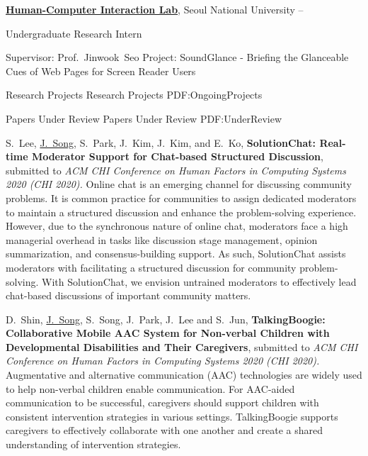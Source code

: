 \documentclass[letterpaper,MMMyyyy,nonstopmode]{template}
\begin{document}
\begin{Body}
\BigGap
\Entry
\href{http://hcil.snu.ac.kr/}
{\textbf{Human-Computer Interaction Lab}},
Seoul National University
\hfill
{} --

\Gap
\BulletItem
Undergraduate Research Intern
\begin{Detail}

\SubBulletItem
Supervisor:
Prof.~Jinwook~Seo
\SubBulletItem
Project:
SoundGlance - Briefing the Glanceable Cues of Web Pages for Screen Reader Users

\end{Detail}



\BigGap
\Section
{Research Projects}
{Research Projects}
{PDF:OngoingProjects}

\SubSection
{Papers Under Review}
{Papers Under Review}
{PDF:UnderReview}

\begingroup
\renewcommand{\MaxNumberedItem}{[88]}

\BigGap
\NumberedItem{[1]}
  S.~Lee, \underline{J.~Song}, S.~Park, J.~Kim, J.~Kim, and E.~Ko,
  \textbf{SolutionChat: Real-time Moderator Support for Chat-based Structured Discussion},
  submitted to \textit{ACM CHI Conference on Human Factors in Computing Systems 2020 (CHI 2020).}
  \vspace{2mm}\newline
  {\small{
    Online chat is an emerging channel for discussing community problems. It is common practice for communities to assign dedicated moderators to maintain a structured discussion and enhance the problem-solving experience. However, due to the synchronous nature of online chat, moderators face a high managerial overhead in tasks like discussion stage management, opinion summarization, and consensus-building support. As such, SolutionChat assists moderators with facilitating a structured discussion for community problem-solving.
    With SolutionChat, we envision untrained moderators to effectively lead chat-based discussions of important community matters.
  }}


\BigGap
\NumberedItem{[2]}
  D.~Shin, \underline{J.~Song}, S.~Song, J.~Park, J.~Lee and S.~Jun,
  \textbf{TalkingBoogie: Collaborative Mobile AAC System for Non-verbal Children with Developmental Disabilities and Their Caregivers},
  submitted to \textit{ACM CHI Conference on Human Factors in Computing Systems 2020 (CHI 2020).}
  \vspace{2mm}\newline
  {\small{
    Augmentative and alternative communication (AAC) technologies are widely used to help non-verbal children enable communication. For AAC-aided communication to be successful, caregivers should support children with consistent intervention strategies in various settings. TalkingBoogie supports caregivers to effectively collaborate with one another and create a shared understanding of intervention strategies.
  }}


\end{Body}
\end{document}
